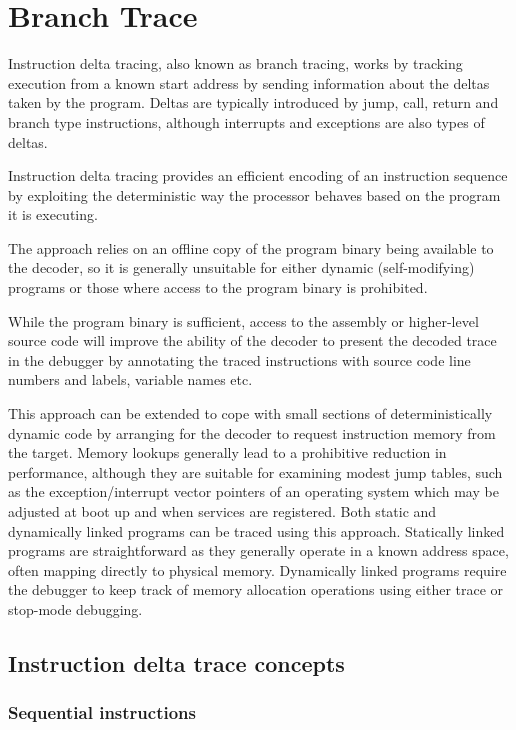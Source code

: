 \chapter{Branch Trace} \label{Branch Trace}


Instruction delta tracing, also known as branch tracing, works by
tracking execution from a known start address by sending information
about the deltas taken by the program. Deltas are typically introduced
by jump, call, return and branch type instructions, although
interrupts and exceptions are also types of deltas.

Instruction delta tracing provides an efficient encoding of an
instruction sequence by exploiting the deterministic way the processor
behaves based on the program it is executing.

The approach relies on
an offline copy of the program binary being available to the decoder, so it
is generally unsuitable for either dynamic (self-modifying) programs
or those where access to the program binary is prohibited.

While the program binary is sufficient, access to the assembly or
higher-level source code will improve the ability of the decoder to present
the decoded trace in the debugger by annotating the traced instructions with
source code line numbers and labels, variable names etc.

This approach can be extended to cope with small sections of
deterministically dynamic code by arranging for the decoder to request
instruction memory from the target. Memory lookups generally lead to a
prohibitive reduction in performance, although they are suitable for
examining modest jump tables, such as the exception/interrupt vector
pointers of an operating system which may be adjusted at boot up and
when services are registered.  Both static and dynamically linked
programs can be traced using this approach. Statically linked programs
are straightforward as they generally operate in a known address
space, often mapping directly to physical memory. Dynamically linked
programs require the debugger to keep track of memory allocation
operations using either trace or stop-mode debugging.

\section{Instruction delta trace concepts} \label{Trace Concepts}

\subsection{Sequential instructions} \label{Sequential Instructions}

